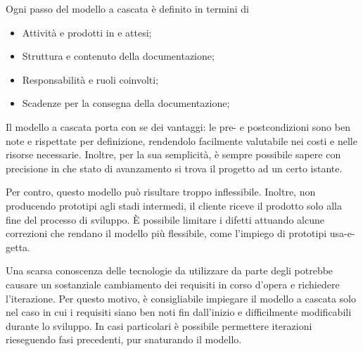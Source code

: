Ogni passo del modello a cascata è definito in termini di
\begin{itemize}
	\item Attività e prodotti in  e  attesi;
	\item Struttura e contenuto della documentazione;
	\item Responsabilità e ruoli coinvolti;
	\item Scadenze per la consegna della documentazione;
\end{itemize}

Il modello a cascata porta con se dei vantaggi: le pre- e postcondizioni sono ben note e rispettate per definizione, rendendolo facilmente valutabile nei costi e nelle risorse necessarie. Inoltre, per la sua semplicità, è sempre possibile sapere con precisione in che stato di avanzamento si trova il progetto ad un certo istante.

Per contro, questo modello può risultare troppo inflessibile. Inoltre, non producendo prototipi agli stadi intermedi, il cliente riceve il prodotto solo alla fine del processo di sviluppo. È possibile limitare i difetti attuando alcune correzioni che rendano il modello più flessibile, come l'impiego di prototipi usa-e-getta. 

Una scarsa conoscenza delle tecnologie da utilizzare da parte degli  potrebbe causare un sostanziale cambiamento dei requisiti in corso d'opera e richiedere l'iterazione. Per questo motivo, è consigliabile impiegare il modello a cascata solo nel caso in cui i requisiti siano ben noti fin dall'inizio e difficilmente modificabili durante lo sviluppo. In casi particolari è possibile permettere iterazioni rieseguendo fasi precedenti, pur snaturando il modello.

